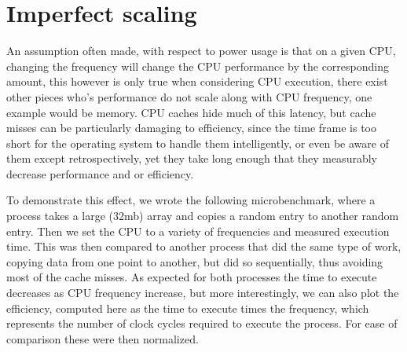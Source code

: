 \section{Imperfect scaling}\label{sec:case-study}

An assumption often made, with respect to power usage is that on a given CPU, changing the frequency will change the CPU performance by the corresponding amount, this however is only true when considering CPU execution, there exist other pieces who's performance do not scale along with CPU frequency, one example would be memory. CPU caches hide much of this latency, but cache misses can be particularly damaging to efficiency, since the time frame is too short for the operating system to handle them intelligently, or even be aware of them except retrospectively, yet they take long enough that they measurably decrease performance and or efficiency.
 
To demonstrate this effect, we wrote the following microbenchmark, where a process takes a large (32mb) array and copies a random entry to another random entry. Then we set the CPU to a variety of frequencies and measured execution time.  This was then compared to another process that did the same type of work, copying data from one point to another, but did so sequentially, thus avoiding most of the cache misses. As expected for both processes the time to execute decreases as CPU frequency increase, but more interestingly, we can also plot the efficiency, computed here as the time to execute times the frequency, which represents the number of clock cycles required to execute the process. For ease of comparison these were then normalized.


